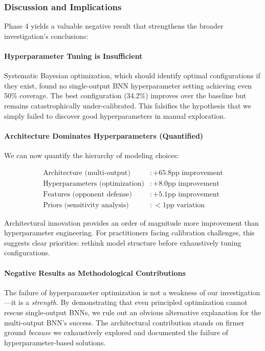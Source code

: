 \subsubsection{Discussion and Implications}

Phase 4 yields a valuable negative result that strengthens the broader investigation's conclusions:

\paragraph{Hyperparameter Tuning is Insufficient}

Systematic Bayesian optimization, which should identify optimal configurations if they exist, found no single-output BNN hyperparameter setting achieving even 50\% coverage. The best configuration (34.2\%) improves over the baseline but remains catastrophically under-calibrated. This falsifies the hypothesis that we simply failed to discover good hyperparameters in manual exploration.

\paragraph{Architecture Dominates Hyperparameters (Quantified)}

We can now quantify the hierarchy of modeling choices:

\begin{align}
    \text{Architecture (multi-output)} &: +65.8\text{pp improvement} \\
    \text{Hyperparameters (optimization)} &: +8.0\text{pp improvement} \\
    \text{Features (opponent defense)} &: +5.1\text{pp improvement} \\
    \text{Priors (sensitivity analysis)} &: <1\text{pp variation}
\end{align}

Architectural innovation provides an order of magnitude more improvement than hyperparameter engineering. For practitioners facing calibration challenges, this suggests clear priorities: rethink model structure before exhaustively tuning configurations.

\paragraph{Negative Results as Methodological Contributions}

The failure of hyperparameter optimization is not a weakness of our investigation—it is a \textit{strength}. By demonstrating that even principled optimization cannot rescue single-output BNNs, we rule out an obvious alternative explanation for the multi-output BNN's success. The architectural contribution stands on firmer ground \textit{because} we exhaustively explored and documented the failure of hyperparameter-based solutions.

